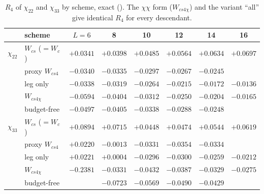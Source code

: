 \begin{table}[ht]
\centering\footnotesize\renewcommand{\arraystretch}{1.15}
\begin{tabular}{@{}llcccccc@{}}
\toprule
 & scheme & $L=6$ & 8 & 10 & 12 & 14 & 16 \\\midrule
$\chi_{22}$ & $W_{cs}$ ($=W_c$) & $+0.0341$ & $+0.0398$ & $+0.0485$ & $+0.0564$ & $+0.0634$ & $+0.0697$ \\
 & proxy $W_{cs4}$ & $-0.0340$ & $-0.0335$ & $-0.0297$ & $-0.0267$ & $-0.0245$ & \\
 & leg only & $-0.0338$ & $-0.0319$ & $-0.0264$ & $-0.0215$ & $-0.0172$ & $-0.0136$ \\
 & $W_{cs4\chi}$ & $-0.0594$ & $-0.0404$ & $-0.0312$ & $-0.0250$ & $-0.0204$ & $-0.0165$ \\
 & budget-free & $-0.0497$ & $-0.0405$ & $-0.0338$ & $-0.0288$ & $-0.0248$ & \\\midrule
$\chi_{33}$ & $W_{cs}$ ($=W_c$) & $+0.0894$ & $+0.0715$ & $+0.0448$ & $+0.0474$ & $+0.0544$ & $+0.0619$ \\
 & proxy $W_{cs4}$ & $+0.0220$ & $-0.0013$ & $-0.0331$ & $-0.0354$ & $-0.0334$ & \\
 & leg only & $+0.0221$ & $+0.0004$ & $-0.0296$ & $-0.0300$ & $-0.0259$ & $-0.0212$ \\
 & $W_{cs4\chi}$ & $-0.2381$ & $-0.0331$ & $-0.0432$ & $-0.0387$ & $-0.0329$ & $-0.0275$ \\
 & budget-free & & $-0.0723$ & $-0.0569$ & $-0.0490$ & $-0.0429$ & \\
\bottomrule
\end{tabular}
\caption{$R_4$ of $\chi_{22}$ and $\chi_{33}$ by scheme, exact (). The
$\chi\chi$ form ($W_{cs4\chi}$) and the variant ``all'' give identical $R_4$ for every descendant.}
\label{d2:tab:r4chi}
\end{table}

